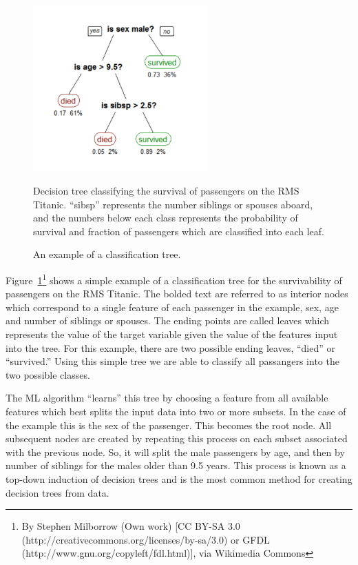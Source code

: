 \begin{figure}[ht]
	\begin{center}
		\includegraphics[width=0.6\textwidth]{figures/CART_tree_titanic_survivors.pdf} 
	\end{center}
	\caption{An example of a classification tree.}
	Decision tree classifying the survival of passengers on the RMS Titanic. ``sibsp'' represents the number siblings or spouses aboard, and the numbers below each class represents the probability of survival and fraction of passengers which are classified into each leaf. 
	\label{fig: cart tree} 
\end{figure}

Figure~\ref{fig: cart tree}\footnote{By Stephen Milborrow (Own work) [CC BY-SA 3.0 (http://creativecommons.org/licenses/by-sa/3.0) or GFDL (http://www.gnu.org/copyleft/fdl.html)], via Wikimedia Commons} shows a simple example of a classification tree for the survivability of passengers on the RMS Titanic. The bolded text are referred to as interior nodes which correspond to a single feature of each passenger in the example, sex, age and number of siblings or spouses. The ending points are called leaves which represents the value of the target variable given the value of the features input into the tree. For this example, there are two possible ending leaves, ``died'' or ``survived.'' Using this simple tree we are able to classify all passangers into the two possible classes. 

The ML algorithm ``learns'' this tree by choosing a feature from all available features which best splits the input data into two or more subsets. In the case of the example this is the sex of the passenger. This becomes the root node. All subsequent nodes are created by repeating this process on each subset associated with the previous node. So, it will split the male passengers by age, and then by number of siblings for the males older than 9.5 years. This process is known as a top-down induction of decision trees and is the most common method for creating decision trees from data.

